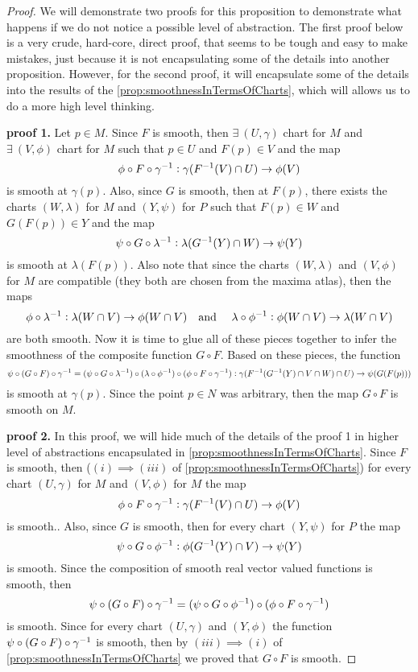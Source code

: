 \begin{proof}
	We will demonstrate two proofs for this proposition to demonstrate what happens if we do not notice a possible level of abstraction. The first proof below is a very crude, hard-core, direct proof, that seems to be tough and easy to make mistakes, just because it is not encapsulating some of the details into another proposition. However, for the second proof, it will encapsulate some of the details into the results of the \autoref{prop:smoothnessInTermsOfCharts}, which will allows us to do a more high level thinking.
	
	\textbf{proof 1.} Let $ p \in M $. Since $ F $ is smooth, then $ \exists\ (U,\gamma) $ chart for $ M $ and $ \exists\ (V,\phi) $ chart for $ M $ such that $ p \in U $ and $ F(p) \in V $ and the map
	\[ \phi\circ  F \circ \gamma^{-1}: \gamma(F^{-1}(V)\cap U) \to \phi(V)  \]
	is smooth at $ \gamma(p) $. Also, since $ G $ is smooth, then at $ F(p) $, there exists the charts $ (W,\lambda) $ for $ M $ and $ (Y,\psi) $ for $ P $ such that $ F(p) \in W $ and $ G(F(p)) \in Y $ and the map
	\[ \psi\circ G \circ \lambda^{-1}: \lambda(G^{-1}(Y)\cap W) \to \psi(Y)  \]
	is smooth at $ \lambda(F(p)) $. Also note that since the charts $ (W,\lambda) $ and $ (V,\phi) $ for $ M $ are compatible (they both are chosen from the maxima atlas), then the maps
	\[ \phi \circ \lambda^{-1}: \lambda(W\cap V) \to \phi(W\cap V) \quad \text{and}\ \quad \lambda\circ \phi^{-1}:\phi(W\cap V) \to \lambda(W\cap V) \]
	are both smooth. Now it is time to glue all of these pieces together to infer the smoothness of the composite function $ G\circ F $. Based on these pieces, the function
	\[ \psi \circ (G \circ F) \circ \gamma^{-1} = ( \psi\circ G \circ \lambda^{-1})\circ (\lambda \circ \phi^{-1}) \circ (\phi\circ  F \circ \gamma^{-1}) : \gamma(F^{-1}(G^{-1}(Y)\cap V\cap W)\cap U)\to \psi(G(F(p))) \]
	is smooth at $ \gamma(p) $. Since the point $ p \in N $ was arbitrary, then the map $ G\circ F $ is smooth on $ M $.
	
	\textbf{proof 2.} In this proof, we will hide much of the details of the proof 1 in higher level of abstractions encapsulated in \autoref{prop:smoothnessInTermsOfCharts}.  Since $ F $ is smooth, then ($ (i)\implies (iii) $ of \autoref{prop:smoothnessInTermsOfCharts}) for every chart $ (U,\gamma) $  for $ M $ and $ (V,\phi) $  for $ M $ the map
	\[ \phi\circ  F \circ \gamma^{-1}: \gamma(F^{-1}(V)\cap U) \to \phi(V)  \]
	is smooth.. Also, since $ G $ is smooth, then for every chart  $(Y,\psi) $ for $ P $ the map
	\[ \psi \circ G \circ \phi^{-1}: \phi(G^{-1}(Y)\cap V) \to \psi(Y)  \]
	is smooth. Since the composition of smooth real vector valued functions is smooth, then 
	\[ \psi\circ(G\circ F)\circ\gamma^{-1} = (\psi\circ G\circ \phi^{-1})\circ(\phi \circ F \circ \gamma^{-1}) \]
	is smooth. Since for every chart $ (U,\gamma) $ and $ (Y,\phi) $ the function $ \psi\circ(G\circ F)\circ\gamma^{-1} $ is smooth, then by $ (iii)\implies (i) $ of \autoref{prop:smoothnessInTermsOfCharts} we proved that $G\circ F $ is smooth.
\end{proof}


